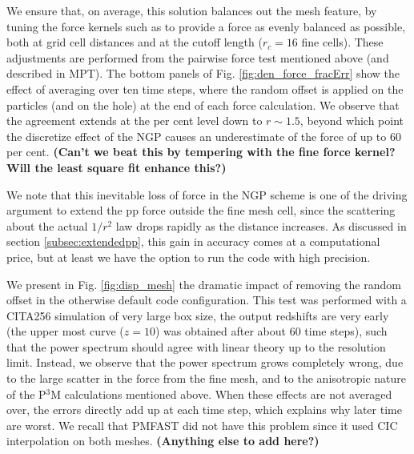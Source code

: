 We ensure that, on average, this solution balances out the mesh feature,
by tuning the force kernels such as to provide a force as evenly balanced as possible, both at grid cell distances
and at the cutoff length ($r_{c}=16$ fine cells).
These adjustments are performed from the pairwise force test mentioned above (and described in MPT).
The bottom panels of Fig. \ref{fig:den_force_fracErr} show the effect of averaging over ten time steps, 
where the random offset is applied on the particles (and on the hole) at the end of each force calculation. 
We observe that the agreement extends at the per cent level down to $r \sim 1.5$, beyond which point
the discretize effect of the NGP causes an underestimate of the force of up to 60 per cent.
{\bf (Can't we beat this by tempering with the fine force kernel? Will the least square fit enhance this?)}

We note that this inevitable loss of force in the NGP scheme is one of the driving argument to extend the pp force outside the fine mesh cell,
since the scattering about the actual $1/r^{2}$ law drops rapidly as the distance increases.
As discussed in section \ref{subsec:extendedpp}, this gain in accuracy comes at a computational price,
but at least we have the option to run the code with high precision.

We present in Fig. \ref{fig:disp_mesh} the dramatic impact of removing the random offset in the otherwise default code configuration.
This test was performed with a CITA256 simulation of very large box size,
the output redshifts are very early (the upper most curve ($z=10$) was obtained after
about 60 time steps), such that the power spectrum should agree with linear theory up to the resolution limit.
Instead, we observe that the power spectrum grows completely wrong, due to the large scatter in the force from the fine mesh,
and to the anisotropic nature of the P$^3$M calculations mentioned above.
When these effects are not averaged over, the errors directly add up at each time step,
which explains why later time are worst.
We recall that {\small PMFAST} did not have this problem since it used CIC interpolation on both meshes.  
{\bf (Anything else to add here?)}

